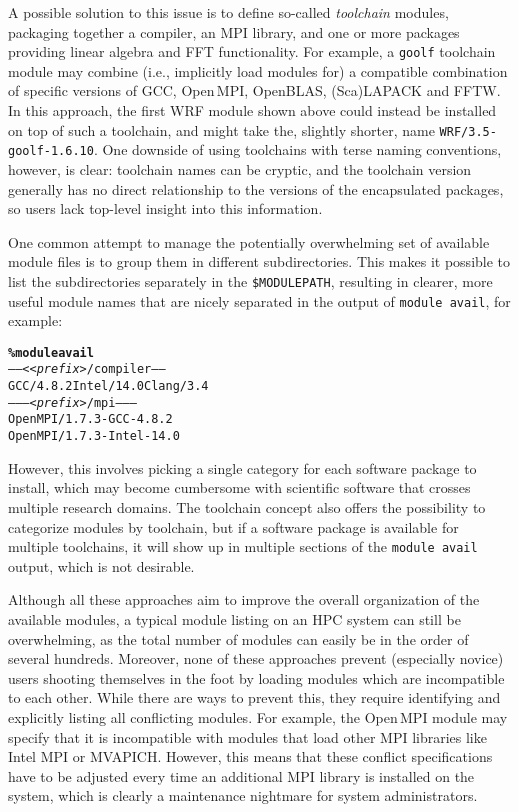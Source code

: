A possible solution to this issue is to define so-called \emph{toolchain}
modules, packaging together a compiler, an MPI library, and one or more packages
providing linear algebra and FFT functionality. For example, a \texttt{\small goolf}
toolchain module may combine (i.e., implicitly load modules for) a compatible combination of specific versions of GCC,
Open\,MPI, OpenBLAS, (Sca)LAPACK and FFTW. In this approach, the
first WRF module shown above could instead be installed on top of such a toolchain,
and might take the, slightly shorter, name \texttt{\small WRF/3.5-goolf-1.6.10}.
One downside of using toolchains with terse naming conventions, however, is clear: toolchain names can be cryptic, and the toolchain version generally has no direct relationship to the versions of the encapsulated packages, so users lack top-level insight into 
this information.

One common attempt to manage the potentially overwhelming set of available
module files is to group them in different subdirectories. This makes 
it possible to list the subdirectories separately in the
\texttt{\small\$MODULEPATH}, resulting in clearer, more useful
 module names that are
nicely separated in the output of
\texttt{\small module avail}, for example:
{\small
\begin{alltt}
    \textbf{\% module avail}
    ----- <\emph{<prefix>}/compiler -----
    GCC/4.8.2   Intel/14.0  Clang/3.4
    -------- \emph{<prefix>}/mpi --------
    OpenMPI/1.7.3-GCC-4.8.2
    OpenMPI/1.7.3-Intel-14.0\
\end{alltt}
}
\noindent
However, this involves picking a single category for each software package to
install, which may become cumbersome with scientific software that crosses multiple
research domains. The toolchain concept also offers the possibility to categorize
modules by toolchain, but if a software package is available for multiple
toolchains, it will show up in multiple sections of the \texttt{\small module
avail} output, which is not desirable.


Although all these approaches aim to improve the overall
organization of the available modules, a typical module listing on an HPC
system can still be overwhelming, as the total number of modules can easily
be in the order of several hundreds. Moreover, none of these approaches prevent (especially novice) users shooting themselves in the
foot by loading modules which are incompatible to each other. While
there are ways to prevent this, they require identifying and explicitly listing
all conflicting modules. For example, the Open\,MPI module may
specify that it is incompatible with modules that load other MPI libraries like
Intel MPI or MVAPICH. However, this means that these conflict specifications have
to be adjusted every time an additional MPI library is installed on the
system, which is clearly a maintenance nightmare for system administrators.

